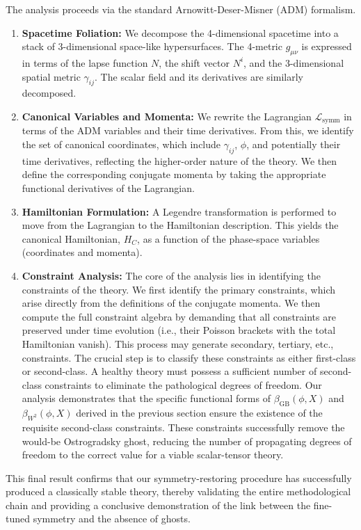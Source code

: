 \documentclass[twocolumn]{aastex631}
\begin{document}
The analysis proceeds via the standard Arnowitt-Deser-Misner (ADM) formalism.
\begin{enumerate}
    \item \textbf{Spacetime Foliation:} We decompose the 4-dimensional spacetime into a stack of 3-dimensional space-like hypersurfaces. The 4-metric $g_{\mu\nu}$ is expressed in terms of the lapse function $N$, the shift vector $N^i$, and the 3-dimensional spatial metric $\gamma_{ij}$. The scalar field and its derivatives are similarly decomposed.
    
    \item \textbf{Canonical Variables and Momenta:} We rewrite the Lagrangian $\mathcal{L}_{\text{symm}}$ in terms of the ADM variables and their time derivatives. From this, we identify the set of canonical coordinates, which include $\gamma_{ij}$, $\phi$, and potentially their time derivatives, reflecting the higher-order nature of the theory. We then define the corresponding conjugate momenta by taking the appropriate functional derivatives of the Lagrangian.
    
    \item \textbf{Hamiltonian Formulation:} A Legendre transformation is performed to move from the Lagrangian to the Hamiltonian description. This yields the canonical Hamiltonian, $H_C$, as a function of the phase-space variables (coordinates and momenta).
    
    \item \textbf{Constraint Analysis:} The core of the analysis lies in identifying the constraints of the theory. We first identify the primary constraints, which arise directly from the definitions of the conjugate momenta. We then compute the full constraint algebra by demanding that all constraints are preserved under time evolution (i.e., their Poisson brackets with the total Hamiltonian vanish). This process may generate secondary, tertiary, etc., constraints. The crucial step is to classify these constraints as either first-class or second-class. A healthy theory must possess a sufficient number of second-class constraints to eliminate the pathological degrees of freedom. Our analysis demonstrates that the specific functional forms of $\beta_{\text{GB}}(\phi,X)$ and $\beta_{W^2}(\phi,X)$ derived in the previous section ensure the existence of the requisite second-class constraints. These constraints successfully remove the would-be Ostrogradsky ghost, reducing the number of propagating degrees of freedom to the correct value for a viable scalar-tensor theory.
\end{enumerate}
This final result confirms that our symmetry-restoring procedure has successfully produced a classically stable theory, thereby validating the entire methodological chain and providing a conclusive demonstration of the link between the fine-tuned symmetry and the absence of ghosts.
\end{document}
